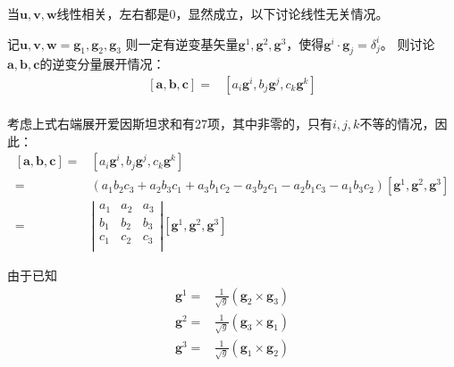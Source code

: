 \documentclass[UTF8,zihao=5]{ctexart}
\begin{document}
当$\bm{u},\bm{v},\bm{w}$线性相关，左右都是0，显然成立，以下讨论线性无关情况。

记$\bm{u},\bm{v},\bm{w}=\bm{g}_1, \bm{g}_2, \bm{g}_3$
则一定有逆变基矢量$\bm{g}^1, \bm{g}^2, \bm{g}^3$，使得$\bm{g}^i\cdot\bm{g}_j=\delta^i_j$。
则讨论$\bm{a},\bm{b},\bm{c}$的逆变分量展开情况：
\begin{equation*}
    \begin{aligned}
        [\bm{a},\bm{b},\bm{c}]
        =&[a_i\bm{g}^i,b_j\bm{g}^j,c_k\bm{g}^k]\\
    \end{aligned}
\end{equation*}

考虑上式右端展开爱因斯坦求和有27项，其中非零的，只有$i,j,k$不等的情况，因此：
\begin{equation*}
    \begin{aligned}
        [\bm{a},\bm{b},\bm{c}]
        =&[a_i\bm{g}^i,b_j\bm{g}^j,c_k\bm{g}^k]\\
        =&(
            a_1b_2c_3 + a_2b_3c_1 + a_3b_1c_2
            -a_3b_2c_1 - a_2b_1c_3 - a_1b_3c_2
        )
        [\bm{g}^1, \bm{g}^2, \bm{g}^3]\\
        =&\left|
            \begin{matrix}
                a_1 &a_2 &a_3\\
                b_1 &b_2 &b_3\\
                c_1 &c_2 &c_3\\
            \end{matrix}
        \right|[\bm{g}^1, \bm{g}^2, \bm{g}^3]
    \end{aligned}
\end{equation*}

由于已知
\begin{equation*}
    \begin{aligned}
        \bm{g}^1=&
        \frac{1}{\sqrt{g}}(\bm{g}_2\times\bm{g}_3)\\
        \bm{g}^2=&
        \frac{1}{\sqrt{g}}(\bm{g}_3\times\bm{g}_1)\\
        \bm{g}^3=&
        \frac{1}{\sqrt{g}}(\bm{g}_1\times\bm{g}_2)\\
    \end{aligned}
\end{equation*}
\end{document}
